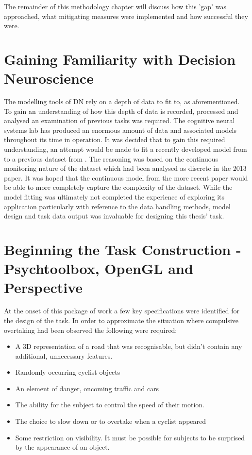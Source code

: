 The remainder of this methodology chapter will discuss how this 'gap' was approached, what mitigating measures were implemented and how successful they were.

\section{Gaining Familiarity with Decision Neuroscience}
The modelling tools of DN rely on a depth of data to fit to, as aforementioned. To gain an understanding of how this depth of data is recorded, processed and analysed an examination of previous tasks was required. The cognitive neural systems lab has produced an enormous amount of data and associated models throughout its time in operation. It was decided that to gain this required understanding, an attempt would be made to fit a recently developed model from \citet{geuzebroekBalancingTrueFalse2023} to a previous dataset from \citet{kellyInternalExternalInfluences2013}. The reasoning was based on the continuous monitoring nature of the dataset which had been analysed as discrete in the 2013 paper. It was hoped that the continuous model from the more recent paper would be able to more completely capture the complexity of the dataset. While the model fitting was ultimately not completed the experience of exploring its application particularly with reference to the data handling methods, model design and task data output was invaluable for designing this thesis' task.

\section{Beginning the Task Construction - Psychtoolbox, OpenGL and Perspective}
At the onset of this package of work a few key specifications were identified for the design of the task. In order to approximate the situation where compulsive overtaking had been observed the following were required:
\begin{itemize}
    \item A 3D representation of a road that was recognisable, but didn't contain any additional, unnecessary features.
    \item Randomly occurring cyclist objects
    \item An element of danger, oncoming traffic and cars 
    \item The ability for the subject to control the speed of their motion.
    \item The choice to slow down or to overtake when a cyclist appeared
    \item Some restriction on visibility. It must be possible for subjects to be surprised by the appearance of an object. 
\end{itemize}

